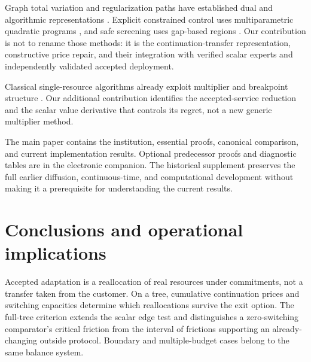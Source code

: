 \documentclass[11pt,letterpaper]{article}
\theoremstyle{definition}
\newcommand{\1}{\mathbf 1}
\begin{document}
Graph total variation and regularization paths have established dual and algorithmic representations \citep{TibshiraniTaylor2011,ArnoldTibshirani2016}. Explicit constrained control uses multiparametric quadratic programs \citep{Bemporad2002}, and safe screening uses gap-based regions \citep{Fercoq2015}. Our contribution is not to rename those methods: it is the continuation-transfer representation, constructive price repair, and their integration with verified scalar experts and independently validated accepted deployment.

Classical single-resource algorithms already exploit multiplier and breakpoint structure \citep{PatrikssonStromberg2015}. Our additional contribution identifies the accepted-service reduction and the scalar value derivative that controls its regret, not a new generic multiplier method.

The main paper contains the institution, essential proofs, canonical comparison, and current implementation results. Optional predecessor proofs and diagnostic tables are in the electronic companion. The historical supplement preserves the full earlier diffusion, continuous-time, and computational development without making it a prerequisite for understanding the current results.











\section{Conclusions and operational implications}
Accepted adaptation is a reallocation of real resources under commitments, not a transfer taken from the customer. On a tree, cumulative continuation prices and switching capacities determine which reallocations survive the exit option. The full-tree criterion extends the scalar edge test and distinguishes a zero-switching comparator's critical friction from the interval of frictions supporting an already-changing outside protocol. Boundary and multiple-budget cases belong to the same balance system.
\end{document}
